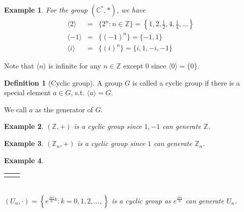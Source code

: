 \documentclass{article}
\theoremstyle{MyNonumberplain}
\theoremstyle{break}
\newcommand{\Z}{\mathbb{Z}}
\newcommand{\C}{\mathbb{C}}
\newcommand{\cyclic}[1]{\langle #1 \rangle}
\newcommand{\nline}{\begin{tabular}{ll}&\\\end{tabular}}
\theoremstyle{break}
\newtheorem{example}{Example}[section]
\theoremstyle{break}
\theoremstyle{definition}
\theoremstyle{break}
\newtheorem{definition}{Definition}[section]
\begin{document}
\begin{expbox}
    \begin{example}
        For the group $(\C^*,*)$, we have
        \begin{eqnarray} 
            \langle 2 \rangle & = & \{ 2^n : n \in \mathbb{Z} \} = \left\{ 1, 2, \frac{1}{2}, 4, \frac{1}{4}, \ldots \right\} \nonumber\\
            \cyclic{-1} & = & \{(-1)^n\}=\{-1,1\} \nonumber\\
            \cyclic{i}  & = & \{(i)^n\} = \{i,1,-i,-1\} \nonumber
        \end{eqnarray}
    \end{example}
\end{expbox}

Note that $\cyclic{n}$ is infinite for any $n\in\Z$ except 0 since $\cyclic{0}=\{0\}$.

\begin{defbox}
    \begin{definition}[Cyclic group]
        A group $G$ is called a cyclic group if there is a special element $a\in G$, s.t. $\cyclic{a}=G$.\bigskip

        We call $a$ as the generator of $G$.
    \end{definition}
\end{defbox}

\begin{expbox}
    \begin{example}
        $(\Z,+)$ is a cyclic group since $1,-1$ can generate $\Z$.
    \end{example}
\end{expbox}

\begin{expbox}
    \begin{example}
        $(\Z_n,+)$ is a cyclic group since $1$ can generate $\Z_n$.
    \end{example}
\end{expbox}

\begin{expbox}
    \begin{example}
        \nline\\
        $(U_n, \cdot) = \left\{ e^{\frac{2 \pi i}{n} k} : k = 0, 1, 2, \ldots, \right\}$ is a cyclic group as $e^{\frac{2 \pi i}{n}}$ can generate $U_n$.
    \end{example}
\end{expbox}

\newpage
\end{document}
